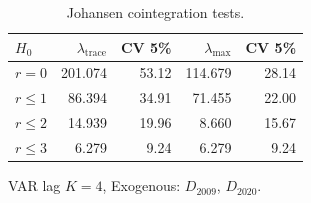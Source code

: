 \begin{table}[ht]
\centering
\begin{threeparttable}
\caption{Johansen cointegration tests.} 
\label{tab:johansen}
\begin{tabular}{lrrrr}
  \toprule
$H_0$ & $\lambda_{\text{trace}}$ & CV 5\% & $\lambda_{\max}$ & CV 5\% \\ 
  \midrule
$r = 0$ & 201.074 & 53.12 & 114.679 & 28.14 \\ 
  $r \leq 1$ & 86.394 & 34.91 & 71.455 & 22.00 \\ 
  $r \leq 2$ & 14.939 & 19.96 & 8.660 & 15.67 \\ 
  $r \leq 3$ & 6.279 & 9.24 & 6.279 & 9.24 \\ 
   \bottomrule
\end{tabular}
\begin{tablenotes}
\small
\item VAR lag $K=4$, Exogenous: $D_{2009}$, $D_{2020}$.
\end{tablenotes}
\end{threeparttable}
\end{table}
